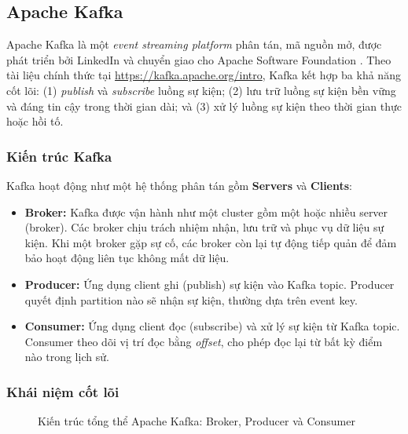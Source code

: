 \subsection{Apache Kafka}

Apache Kafka là một \emph{event streaming platform} phân tán, mã nguồn mở, được
phát triển bởi LinkedIn và chuyển giao cho Apache Software Foundation
\cite{kreps2011kafka}. Theo tài liệu chính thức tại \url{https://kafka.apache.org/intro},
Kafka kết hợp ba khả năng cốt lõi: (1) \emph{publish} và \emph{subscribe} luồng
sự kiện; (2) lưu trữ luồng sự kiện bền vững và đáng tin cậy trong thời gian dài;
và (3) xử lý luồng sự kiện theo thời gian thực hoặc hồi tố.

\subsubsection{Kiến trúc Kafka}

Kafka hoạt động như một hệ thống phân tán gồm \textbf{Servers} và \textbf{Clients}:

\begin{itemize}
  \item \textbf{Broker:} Kafka được vận hành như một cluster gồm một hoặc nhiều
    server (broker). Các broker chịu trách nhiệm nhận, lưu trữ và phục vụ dữ liệu
    sự kiện. Khi một broker gặp sự cố, các broker còn lại tự động tiếp quản để
    đảm bảo hoạt động liên tục không mất dữ liệu.
  \item \textbf{Producer:} Ứng dụng client ghi (publish) sự kiện vào Kafka topic.
    Producer quyết định partition nào sẽ nhận sự kiện, thường dựa trên event key.
  \item \textbf{Consumer:} Ứng dụng client đọc (subscribe) và xử lý sự kiện từ
    Kafka topic. Consumer theo dõi vị trí đọc bằng \emph{offset}, cho phép đọc
    lại từ bất kỳ điểm nào trong lịch sử.
\end{itemize}

\subsubsection{Khái niệm cốt lõi}

\begin{figure}[H]
  \centering
  \setlength{\fboxsep}{12pt}
  \caption{Kiến trúc tổng thể Apache Kafka: Broker, Producer và Consumer}
  \label{fig:kafka-arch}
\end{figure}


